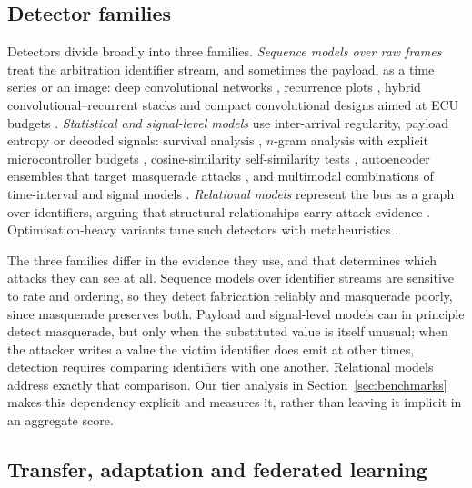 \documentclass[preprint,11pt,authoryear]{elsarticle}
\begin{document}
\subsection{Detector families}

Detectors divide broadly into three families. \emph{Sequence models over raw frames} treat the
arbitration identifier stream, and sometimes the payload, as a time series or an image: deep
convolutional networks \citep{song2020dcnn}, recurrence plots \citep{desta2022reccnn}, hybrid
convolutional--recurrent stacks \citep{lo2022hydlids,singh2026efficient} and compact convolutional
designs aimed at ECU budgets \citep{le2026tinycnn}. \emph{Statistical and signal-level models} use
inter-arrival regularity, payload entropy or decoded signals: survival analysis
\citep{han2018survival}, $n$-gram analysis with explicit microcontroller budgets
\citep{stabili2022daga}, cosine-similarity self-similarity tests \citep{kwak2021cosine},
autoencoder ensembles that target masquerade attacks \citep{rajapaksha2023beyond}, and multimodal
combinations of time-interval and signal models \citep{kang2024canival}. \emph{Relational models}
represent the bus as a graph over identifiers, arguing that structural relationships carry attack
evidence \citep{khreasat2026relational}. Optimisation-heavy variants tune such detectors with
metaheuristics \citep{ileri2025metacan}.

The three families differ in the evidence they use, and that determines which attacks they can see
at all. Sequence models over identifier streams are sensitive to rate and ordering, so they detect
fabrication reliably and masquerade poorly, since masquerade preserves both. Payload and
signal-level models can in principle detect masquerade, but only when the substituted value is
itself unusual; when the attacker writes a value the victim identifier does emit at other times,
detection requires comparing identifiers with one another. Relational models address exactly that
comparison. Our tier analysis in Section~\ref{sec:benchmarks} makes this dependency explicit and
measures it, rather than leaving it implicit in an aggregate score.

\subsection{Transfer, adaptation and federated learning}
\end{document}
